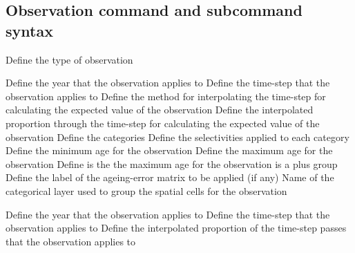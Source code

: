 \subsection{Observation command and subcommand syntax}\par
{}\par\par
{} {Define the type of observation}
\par\textbf{}\par
{} {Define the year that the observation applies to}
 {Define the time-step that the observation applies to}
 {Define the method for interpolating the time-step for calculating the expected value of the observation}
 {Define the interpolated proportion through the time-step for calculating the expected value of the observation}
 {Define the categories}
 {Define the selectivities applied to each category}
 {Define the minimum age for the observation}
 {Define the maximum age for the observation}
 {Define is the the maximum age for the observation is a plus group}
 {Define the label of the ageing-error matrix to be applied (if any)}
 {Name of the categorical layer used to group the spatial cells for the observation}
\par\textbf{}\par
{} {Define the year that the observation applies to}
 {Define the time-step that the observation applies to}
 {Define the interpolated proportion of the time-step passes that the observation applies to}
